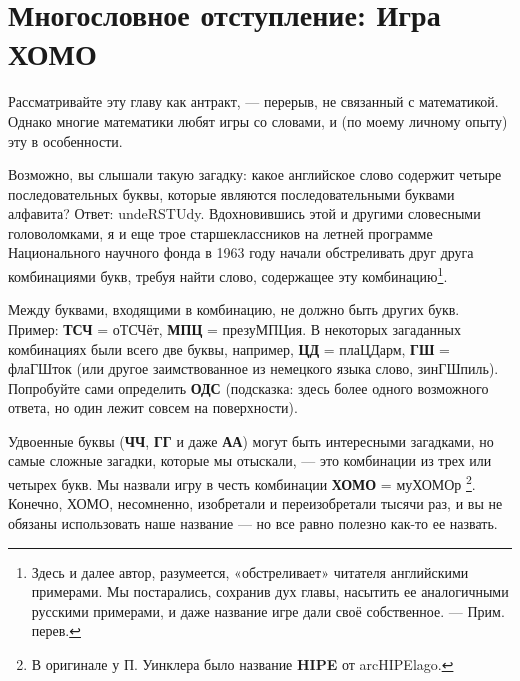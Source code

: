 \chapter{Многословное отступление: Игра ХОМО}




Рассматривайте эту главу как антракт, --- перерыв, не связанный с математикой. Однако многие математики любят игры со словами, и (по моему личному опыту) эту в особенности. 

Возможно, вы слышали такую загадку: какое английское слово содержит четыре последовательных буквы, которые являются последовательными буквами алфавита?
Ответ: undeRSTUdy.
Вдохновившись этой и другими словесными головоломками, я и еще трое старшеклассников на летней программе Национального научного фонда в 1963 году начали обстреливать друг друга комбинациями букв, требуя найти слово, содержащее эту комбинацию\footnote{Здесь и далее автор, разумеется, «обстреливает» читателя английскими примерами. Мы постарались, сохранив дух главы, насытить ее аналогичными русскими примерами, и даже название игре дали своё собственное. --- Прим. перев.}.

Между буквами, входящими в комбинацию, не должно быть других букв.
Пример:
\textbf{ТСЧ} = оТСЧёт,
\textbf{МПЦ} = презуМПЦия.
В некоторых загаданных комбинациях были всего две буквы, например, 
\textbf{ЦД} = плаЦДарм, 
\textbf{ГШ} = флаГШток (или другое заимствованное из немецкого языка слово, зинГШпиль).
Попробуйте сами определить \textbf{ОДС} (подсказка: здесь более одного возможного ответа, но один лежит совсем на поверхности). 

Удвоенные буквы 
(\textbf{ЧЧ}, \textbf{ГГ} и даже \textbf{АА}) могут быть интересными загадками, но самые сложные загадки, которые мы отыскали, --- это комбинации из трех или четырех букв.
Мы назвали игру в честь комбинации \textbf{ХОМО} = муХОМОр%
\footnote{В оригинале у П. Уинклера было название \textbf{HIPE} от arcHIPElago.}.
Конечно, ХОМО, несомненно, изобретали и переизобретали тысячи раз, и вы не обязаны использовать наше название --- но все равно полезно как-то ее назвать. 

